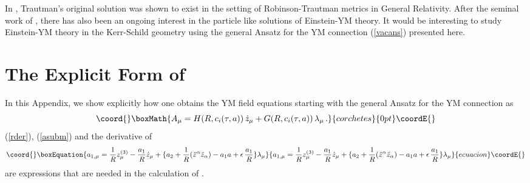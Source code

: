 \documentclass[a4paper,twocolumn,prd,showpacs,amsmath,amssymb]{revtex4}
\begin{document}
In \cite{gurses}, Trautman's original solution was shown to exist in the
setting of Robinson-Trautman metrics in General Relativity. After the
seminal work of \cite{bamck}, there has also been an ongoing interest
in the particle like solutions of Einstein-YM theory. It would be
interesting to study Einstein-YM theory in the Kerr-Schild geometry
using the general Ansatz for the YM connection (\ref{vacans}) presented
here.

\appendix
\section{\label{app1} The Explicit Form of \coordHE{}}

In this Appendix, we show explicitly how one obtains the YM field equations
starting with the general Ansatz for the YM connection \coordHE{} as
\[\coord{}\boxMath{ A_{\mu} = H(R,c_i (\tau,a)) \, \dot{z}_{\mu}
+ G(R,c_i (\tau,a)) \, \lambda_{\mu} \, .}{corchetes}{0pt}\coordE{}\]
\coordHE{} (\ref{rder}), \coordHE{} (\ref{asubm}) and the derivative of
\coordHE{}
\begin{equation}\coord{}\boxEquation{
a_{1,\mu} = \frac{1}{R} z^{(3)}_{\mu} - \frac{a_1}{R} \dot{z}_{\mu}
+ \{ a_2 + \frac{1}{R} (\ddot{z}^{\alpha} \ddot{z}_{\alpha})
- a_1 a + \epsilon \, \frac{a_1}{R} \} \lambda_{\mu} \label{a1der}
}{
a_{1,\mu} = \frac{1}{R} z^{(3)}_{\mu} - \frac{a_1}{R} \dot{z}_{\mu}
+ \{ a_2 + \frac{1}{R} (\ddot{z}^{\alpha} \ddot{z}_{\alpha})
- a_1 a + \epsilon \, \frac{a_1}{R} \} \lambda_{\mu} }{ecuacion}\coordE{}\end{equation}
are expressions that are needed in the calculation of \coordHE{}.
\end{document}
